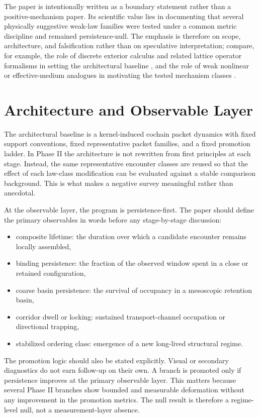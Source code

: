 \documentclass[11pt]{article}
\begin{document}
The paper is intentionally written as a boundary statement rather than a positive-mechanism paper. Its scientific value lies in documenting that several physically suggestive weak-law families were tested under a common metric discipline and remained persistence-null. The emphasis is therefore on scope, architecture, and falsification rather than on speculative interpretation; compare, for example, the role of discrete exterior calculus and related lattice operator formalisms in setting the architectural baseline \cite{dec_placeholder}, and the role of weak nonlinear or effective-medium analogues in motivating the tested mechanism classes \cite{nonlinear_placeholder,effective_medium_placeholder}.

\section{Architecture and Observable Layer}

The architectural baseline is a kernel-induced cochain packet dynamics with fixed support conventions, fixed representative packet families, and a fixed promotion ladder. In Phase II the architecture is not rewritten from first principles at each stage. Instead, the same representative encounter classes are reused so that the effect of each law-class modification can be evaluated against a stable comparison background. This is what makes a negative survey meaningful rather than anecdotal.

At the observable layer, the program is persistence-first. The paper should define the primary observables in words before any stage-by-stage discussion:
\begin{itemize}
\item composite lifetime: the duration over which a candidate encounter remains locally assembled,
\item binding persistence: the fraction of the observed window spent in a close or retained configuration,
\item coarse basin persistence: the survival of occupancy in a mesoscopic retention basin,
\item corridor dwell or locking: sustained transport-channel occupation or directional trapping,
\item stabilized ordering class: emergence of a new long-lived structural regime.
\end{itemize}

The promotion logic should also be stated explicitly. Visual or secondary diagnostics do not earn follow-up on their own. A branch is promoted only if persistence improves at the primary observable layer. This matters because several Phase II branches show bounded and measurable deformation without any improvement in the promotion metrics. The null result is therefore a regime-level null, not a measurement-layer absence.
\end{document}
